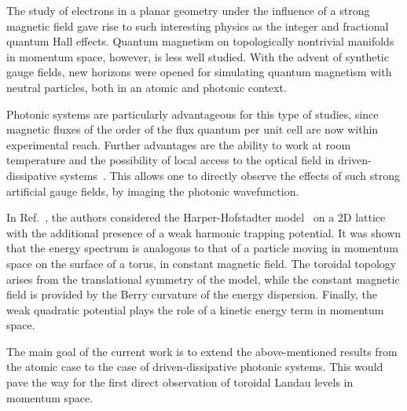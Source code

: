 \documentclass[twocolumn, 10pt, aps, superscriptaddress, floatfix, showpacs, pra, citeautoscript]{revtex4-1}
\newcommand{\co}[2]{#2}
\renewcommand{\paragraph}{\co}
\begin{document}
\paragraph{Quantum magnetism is interesting, even more so in momentum space.}
The study of electrons in a planar geometry under the influence of a
strong magnetic field gave rise to such interesting physics as the
integer and fractional quantum Hall effects. Quantum magnetism on
topologically nontrivial manifolds in momentum space, however, is less
well studied.  With the advent of synthetic gauge fields, new horizons
were opened for simulating quantum magnetism with neutral particles,
both in an atomic and photonic context.

\paragraph{Photonic systems are a good canditate for magnetism.}
Photonic systems are particularly advantageous for this type of
studies, since magnetic fluxes of the order of the flux quantum per
unit cell are now within experimental reach. Further advantages are
the ability to work at room temperature and the possibility of local
access to the optical field in driven-dissipative
systems~\cite{carusotto2013fluids}. This allows one to directly
observe the effects of such strong artificial gauge fields, by imaging
the photonic wavefunction.

\paragraph{Momentum space dual of HH model provides new insights.}
In Ref.~, the authors considered the
Harper-Hofstadter model~\cite{hofstadter1976butterfly} on a 2D lattice
with the additional presence of a weak harmonic trapping potential. It
was shown that the energy spectrum is analogous to that of a particle
moving in momentum space on the surface of a torus, in constant
magnetic field.  The toroidal topology arises from the translational
symmetry of the model, while the constant magnetic field is provided
by the Berry curvature of the energy dispersion. Finally, the weak
quadratic potential plays the role of a kinetic energy term in
momentum space.

\paragraph{The main goal and its importance.}
The main goal of the current work is to extend the above-mentioned
results from the atomic case to the case of driven-dissipative
photonic systems. This would pave the way for the first direct
observation of toroidal Landau levels in momentum space.
\end{document}
